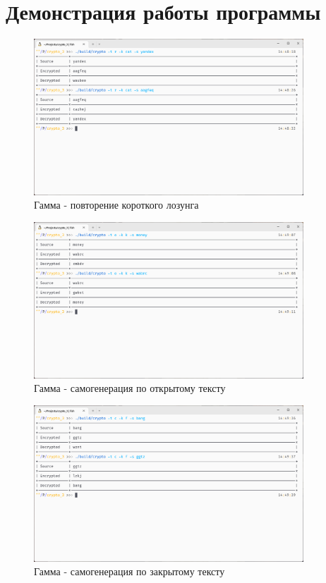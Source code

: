\documentclass[a4paper]{article}
\begin{document}
  \newpage
  \section{Демонстрация работы программы}

  \begin{figure}[H]
    \centering
    \includegraphics[width=0.9\textwidth]{03_00 (3)}
    \caption{Гамма - повторение короткого лозунга}
  \end{figure}

  \begin{figure}[H]
    \centering
    \includegraphics[width=0.9\textwidth]{03_00 (2)}
    \caption{Гамма - самогенерация по открытому тексту}
  \end{figure}

  \begin{figure}[H]
    \centering
    \includegraphics[width=0.9\textwidth]{03_00 (1)}
    \caption{Гамма - самогенерация по закрытому тексту}
  \end{figure}
\end{document}
